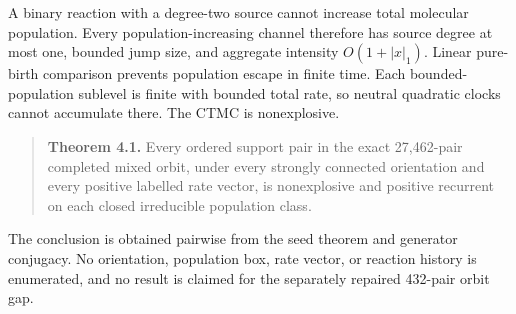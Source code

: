 A binary reaction with a degree-two source cannot increase total
molecular population. Every population-increasing channel therefore has
source degree at most one, bounded jump size, and aggregate intensity
\(O(1+|x|_1)\). Linear pure-birth comparison prevents population escape
in finite time. Each bounded-population sublevel is finite with bounded
total rate, so neutral quadratic clocks cannot accumulate there. The
CTMC is nonexplosive.

\begin{quote}
\textbf{Theorem 4.1.} Every ordered support pair in the exact
27,462-pair completed mixed orbit, under every strongly connected
orientation and every positive labelled rate vector, is nonexplosive and
positive recurrent on each closed irreducible population class.
\end{quote}

The conclusion is obtained pairwise from the seed theorem and generator
conjugacy. No orientation, population box, rate vector, or reaction
history is enumerated, and no result is claimed for the separately
repaired 432-pair orbit gap.
